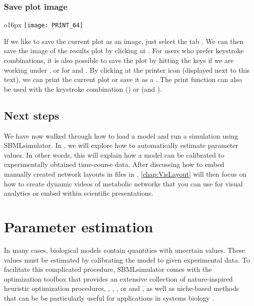 \subsection{Save plot image}
\begin{wrapfigure}{o}{16px}
\vspace{\wrapfigspace}
\texttt{[image: PRINT\_64]}
\end{wrapfigure}
If we like to save the current plot as an image, just select the tab .
We can then save the image of the results plot by clicking at .
For users who prefer keystroke combinations, it is also possible to save the plot by hitting the keys  if we are working under \MacOSX, or  for \Linux and \Windows.
By clicking at the printer icon (displayed next to this text), we can print the current plot or save it as a \PDF.
The print function can also be used with the keystroke combination  (\MacOSX) or  (\Windows and \Linux).


\section{Next steps}

We have now walked through how to load a model and run a simulation using SBMLsimulator.
In , we will explore how to automatically estimate parameter values.
In other words, this will explain how a model can be calibrated to experimentally obtained time-course data.
After discussing how to embed manually created network layouts in \SBML files in , \cref{chap:VisLayout} will then focus on how to create dynamic videos of metabolic networks that you can use for visual analytics or embed within scientific presentations.



\chapter{Parameter estimation}
\label{chap:ParameterEstimation}

In many cases, biological models contain quantities with uncertain values.
These values must be estimated by calibrating the model to given experimental data.
To facilitate this complicated procedure, SBMLsimulator comes with the optimization toolbox \EvA that provides an extensive collection of nature-inspired heuristic optimization procedures, \eg \ES \citep{Rechenberg1973, Schwefel1975}, \GA \citep{Holland1975}, \DE \citep{Storn96Usage}, or \PSO \citep{ClercKennedy02, Clerc2005} and \Tribes \citep{Clerc2006}, as well as niche-based methods that can be be particularly useful for applications in systems biology \citep{Kron09NichingGCB}.


